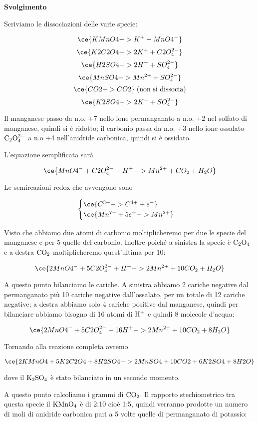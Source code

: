 \vspace{0.2cm}\large\textbf{Svolgimento}\normalsize

\vspace{0.2cm}Scriviamo le dissociazioni delle varie specie:

$$\ce{KMnO4 -> K^+ + MnO4^-}$$
$$\ce{K2C2O4 -> 2K^+ + C2O_4^{2-}}$$
$$\ce{H2SO4 -> 2H^+ + SO_4^{2-}}$$
$$\ce{MnSO4 -> Mn^{2+} + SO_4^{2-}}$$
$$\ce{CO2 -> CO2}\;\text{(non si dissocia)}$$
$$\ce{K2SO4 -> 2K^+ + SO_4^{2-}}$$

Il manganese passo da n.o. +7 nello ione permanganato a n.o. +2 nel solfato di manganese, quindi si è ridotto; il carbonio passa da n.o. +3 nello ione ossalato $\rm C_2O_4^{2-}$ a n.o +4 nell'anidride carbonica, quindi si è ossidato.

L'equazione semplificata sarà

$$\ce{MnO4^- + C2O_4^{2-} + H^+ -> Mn^{2+} + CO_2 + H_2O}$$

Le semireazioni redox che avvengono sono

$$\begin{cases}
    \ce{C^{3+} -> C^{4+} + e^-}\\
    \ce{Mn^{7+} + 5e^- -> Mn^{2+}}
\end{cases}$$

Visto che abbiamo due atomi di carbonio moltiplicheremo per due le specie del manganese e per 5 quelle del carbonio. Inoltre poiché a sinistra la specie è $\rm C_2O_4$ e a destra $\rm CO_2$ moltiplicheremo quest'ultima per 10:

$$\ce{2MnO4^- + 5C2O_4^{2-} + H^+ -> 2Mn^{2+} + 10CO_2 + H_2O}$$

A questo punto bilanciamo le cariche. A sinistra abbiamo 2 cariche negative dal permanganato più 10 cariche negative dall'ossalato, per un totale di 12 cariche negative; a destra abbiamo solo 4 cariche positive dal manganese, quindi per bilanciare abbiamo bisogno di 16 atomi di $\rm H^+$ e quindi 8 molecole d'acqua:

$$\ce{2MnO4^- + 5C2O_4^{2-} + 16H^+ -> 2Mn^{2+} + 10CO_2 + 8H_2O}$$

Tornando alla reazione completa avremo

$$\ce{2KMnO4 + 5K2C2O4 + 8H2SO4 -> 2MnSO4 + 10CO2 + 6K2SO4 + 8H2O}$$

dove il $\rm K_2SO_4$ è stato bilanciato in un secondo momento.

A questo punto calcoliamo i grammi di $\rm CO_2$. Il rapporto stechiometrico tra questa specie il $\rm KMnO_4$ è di 2:10 cioè 1:5, quindi verranno prodotte un numero di moli di anidride carbonica pari a 5 volte quelle di permanganato di potassio:

